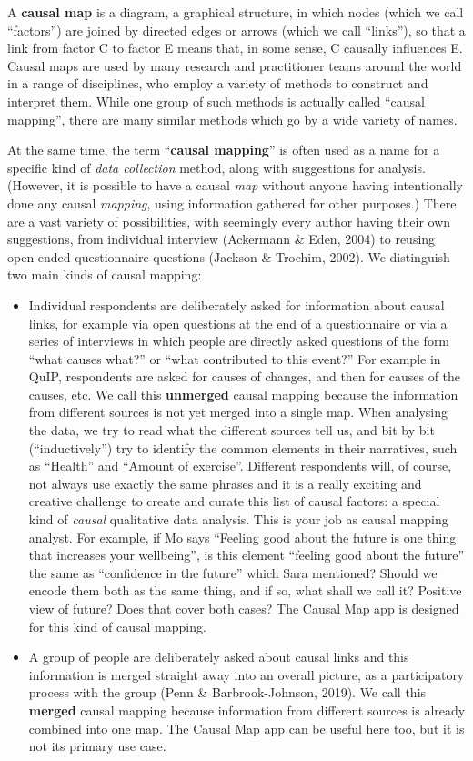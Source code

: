 \documentclass[
]{book}
\begin{document}
A \textbf{causal map} is a diagram, a graphical structure, in which nodes (which we call ``factors'') are joined by directed edges or arrows (which we call ``links''), so that a link from factor C to factor E means that, in some sense, C causally influences E. Causal maps are used by many research and practitioner teams around the world in a range of disciplines, who employ a variety of methods to construct and interpret them. While one group of such methods is actually called ``causal mapping'', there are many similar methods which go by a wide variety of names.

At the same time, the term ``\textbf{causal mapping}'' is often used as a name for a specific kind of \emph{data collection} method, along with suggestions for analysis. (However, it is possible to have a causal \emph{map} without anyone having intentionally done any causal \emph{mapping}, using information gathered for other purposes.) There are a vast variety of possibilities, with seemingly every author having their own suggestions, from individual interview (Ackermann \& Eden, 2004) to reusing open-ended questionnaire questions (Jackson \& Trochim, 2002). We distinguish two main kinds of causal mapping:

\begin{itemize}
\item
  Individual respondents are deliberately asked for information about causal links, for example via open questions at the end of a questionnaire or via a series of interviews in which people are directly asked questions of the form ``what causes what?'' or ``what contributed to this event?'' For example in QuIP, respondents are asked for causes of changes, and then for causes of the causes, etc. We call this \textbf{unmerged} causal mapping because the information from different sources is not yet merged into a single map. When analysing the data, we try to read what the different sources tell us, and bit by bit (``inductively'') try to identify the common elements in their narratives, such as ``Health'' and ``Amount of exercise''. Different respondents will, of course, not always use exactly the same phrases and it is a really exciting and creative challenge to create and curate this list of causal factors: a special kind of \emph{causal} qualitative data analysis. This is your job as causal mapping analyst. For example, if Mo says ``Feeling good about the future is one thing that increases your wellbeing'', is this element ``feeling good about the future'' the same as ``confidence in the future'' which Sara mentioned? Should we encode them both as the same thing, and if so, what shall we call it? Positive view of future? Does that cover both cases? The Causal Map app is designed for this kind of causal mapping.
\item
  A group of people are deliberately asked about causal links and this information is merged straight away into an overall picture, as a participatory process with the group (Penn \& Barbrook-Johnson, 2019). We call this \textbf{merged} causal mapping because information from different sources is already combined into one map. The Causal Map app can be useful here too, but it is not its primary use case.
\end{itemize}
\end{document}
